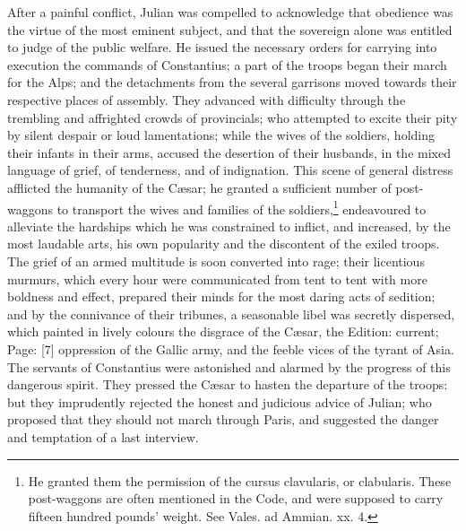 After a painful conflict, Julian was compelled to acknowledge that obedience was the virtue of the most eminent subject, and that the sovereign alone was entitled to judge of the public welfare. He issued the necessary orders for carrying into execution the commands of Constantius; a part of the troops began their march for the Alps; and the detachments from the several garrisons moved towards their respective places of assembly. They advanced with difficulty through the trembling and affrighted crowds of provincials; who attempted to excite their pity by silent despair or loud lamentations; while the wives of the soldiers, holding their infants in their arms, accused the desertion of their husbands, in the mixed language of grief, of tenderness, and of indignation. This scene of general distress afflicted the humanity of the Cæsar; he granted a sufficient number of post-waggons to transport the wives and families of the soldiers,\footnote{He granted them the permission of the cursus clavularis, or clabularis. These post-waggons are often mentioned in the Code, and were supposed to carry fifteen hundred pounds\texthebrew{}’ weight. See Vales. ad Ammian. xx. 4.} endeavoured to alleviate the hardships which he was constrained to inflict, and increased, by the most laudable arts, his own popularity and the discontent of the exiled troops. The grief of an armed multitude is soon converted into rage; their licentious murmurs, which every hour were communicated from tent to tent with more boldness and effect, prepared their minds for the most daring acts of sedition; and by the connivance of their tribunes, a seasonable libel was secretly dispersed, which painted in lively colours the disgrace of the Cæsar, the Edition: current; Page: [7] oppression of the Gallic army, and the feeble vices of the tyrant of Asia. The servants of Constantius were astonished and alarmed by the progress of this dangerous spirit. They pressed the Cæsar to hasten the departure of the troops: but they imprudently rejected the honest and judicious advice of Julian; who proposed that they should not march through Paris, and suggested the danger and temptation of a last interview.


